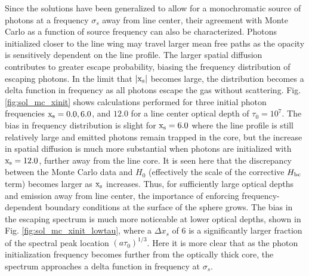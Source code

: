 \documentclass{aastex63}
\begin{document}
Since the solutions have been generalized to allow for a monochromatic source of photons at a frequency $\sigma_s$ away from line center, their agreement with Monte Carlo as a function of source frequency can also be characterized. Photons initialized closer to the line wing may travel larger mean free paths as the opacity is sensitively dependent on the line profile. The larger spatial diffusion contributes to greater escape probability, biasing the frequency distribution of escaping photons. In the limit that $|\rm x_s|$ becomes large, the distribution becomes a delta function in frequency as all photons escape the gas without scattering. Fig. \ref{fig:sol_mc_xinit} shows calculations performed for three initial photon frequencies $\rm x_s = 0.0, 6.0$, and $12.0$ for a line center optical depth of $\tau_0=10^7$. The bias in frequency distribution is slight for $\rm x_s = 6.0$ where the line profile is still relatively large and emitted photons remain trapped in the core, but the increase in spatial diffusion is much more substantial when photons are initialized with $\rm x_s=12.0$, further away from the line core. It is seen here that the discrepancy between the Monte Carlo data and $H_0$ (effectively the scale of the corrective $H_{\rm bc}$ term) becomes larger as $\rm x_s$ increases. Thus, for sufficiently large optical depths and emission away from line center, the importance of enforcing frequency-dependent boundary conditions at the surface of the sphere grows. The bias in the escaping spectrum is much more noticeable at lower optical depths, shown in Fig. \ref{fig:sol_mc_xinit_lowtau}, where a $\Delta x_s$ of 6 is a significantly larger fraction of the spectral peak location $(a\tau_0)^{1/3}$. Here it is more clear that as the photon initialization frequency becomes further from the optically thick core, the spectrum approaches a delta function in frequency at $\sigma_s$. 
\end{document}
